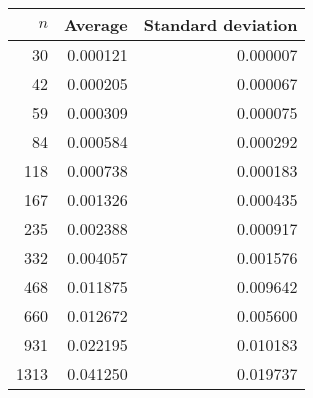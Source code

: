 \begin{tabular}{rrr}
$n$ & Average & Standard deviation\\\hline
30 & 0.000121 & 0.000007\\
42 & 0.000205 & 0.000067\\
59 & 0.000309 & 0.000075\\
84 & 0.000584 & 0.000292\\
118 & 0.000738 & 0.000183\\
167 & 0.001326 & 0.000435\\
235 & 0.002388 & 0.000917\\
332 & 0.004057 & 0.001576\\
468 & 0.011875 & 0.009642\\
660 & 0.012672 & 0.005600\\
931 & 0.022195 & 0.010183\\
1313 & 0.041250 & 0.019737\\
\end{tabular}
